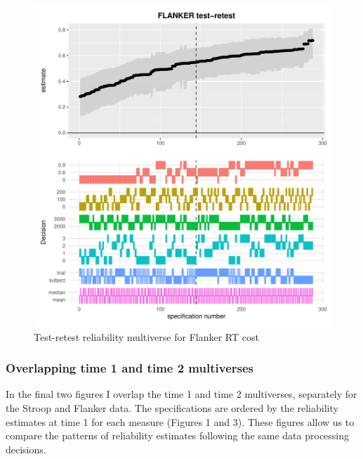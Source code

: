 \documentclass[english,man,floatsintext]{apa6}
\begin{document}
\begin{figure}
\centering
\includegraphics{Reliability_Multiverse_files/figure-latex/unnamed-chunk-10-1.pdf}
\caption{\label{fig:unnamed-chunk-10}Test-retest reliability multiverse for Flanker RT cost}
\end{figure}

\newpage

\hypertarget{overlapping-time-1-and-time-2-multiverses}{%
\subsubsection{Overlapping time 1 and time 2 multiverses}\label{overlapping-time-1-and-time-2-multiverses}}

In the final two figures I overlap the time 1 and time 2 multiverses, separately for the Stroop and Flanker data. The specifications are ordered by the reliability estimates at time 1 for each measure (Figures 1 and 3). These figures allow us to compare the patterns of reliability estimates following the same data processing decisions.
\end{document}
